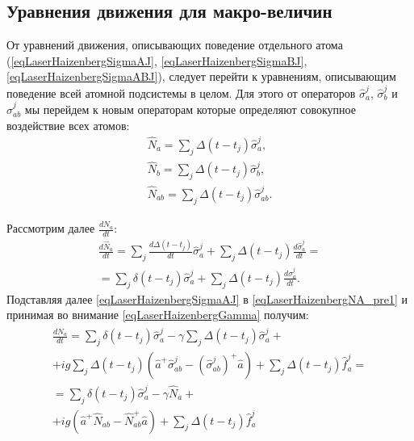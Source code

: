 \subsection{Уравнения движения для макро-величин}
От уравнений движения, описывающих поведение отдельного атома
(\ref{eqLaserHaizenbergSigmaAJ}, \ref{eqLaserHaizenbergSigmaBJ},
\ref{eqLaserHaizenbergSigmaABJ}), следует перейти к уравнениям,
описывающим поведение всей атомной подсистемы в целом. Для этого от
операторов $\hat{\sigma}^{j}_{a}$, $\hat{\sigma}^{j}_{b}$ и
$\hat{\sigma}^{j}_{ab}$ мы перейдем к новым операторам которые
определяют совокупное воздействие всех атомов:
\begin{eqnarray}
\hat{N}_{a} = \sum_j \Delta\left(t - t_j\right)\hat{\sigma}^{j}_{a}, 
\nonumber \\
\hat{N}_{b} = \sum_j \Delta\left(t - t_j\right)\hat{\sigma}^{j}_{b}, 
\nonumber \\
\hat{N}_{ab} = \sum_j \Delta\left(t - t_j\right)\hat{\sigma}^{j}_{ab}.
\label{eqLaserHaizenbergSigmaMacroDef}
\end{eqnarray}

Рассмотрим далее $\frac{d \hat{N}_{a}}{d t}$:
\begin{eqnarray}
\frac{d \hat{N}_{a}}{d t} = 
\sum_j \frac{d \Delta\left(t - t_j\right)}{d t}\hat{\sigma}^{j}_{a} +
\sum_j \Delta\left(t - t_j\right)\frac{d \hat{\sigma}^{j}_{a}}{d t} = 
\nonumber \\
= \sum_j \delta\left(t - t_j\right)\hat{\sigma}^{j}_{a} + \sum_j
\Delta\left(t - t_j\right)\frac{d \hat{\sigma}^{j}_{a}}{d t}. 
\label{eqLaserHaizenbergNA_pre1}
\end{eqnarray}
Подставляя далее \eqref{eqLaserHaizenbergSigmaAJ} в
\eqref{eqLaserHaizenbergNA_pre1} и принимая во внимание
\eqref{eqLaserHaizenbergGamma} получим:
\begin{eqnarray}
\frac{d \hat{N}_{a}}{d t} 
= \sum_j \delta\left(t - t_j\right)\hat{\sigma}^{j}_{a} - \gamma
\sum_j \Delta\left(t - t_j\right) \hat{\sigma}_{a}^{j} +
\nonumber \\
+
i g \sum_j
\Delta\left(t - t_j\right) 
 \left(
\hat{a}^{+}\hat{\sigma}^{j}_{ab} -
\left(\hat{\sigma}^{j}_{ab}\right)^{+}\hat{a}
\right) + \sum_j \Delta\left(t - t_j\right) \hat{f}_{a}^{j} = 
\nonumber \\
= 
\sum_j \delta\left(t - t_j\right)\hat{\sigma}^{j}_{a} - \gamma
\hat{N}_{a} + 
\nonumber \\ 
+ i g  \left(
\hat{a}^{+}\hat{N}_{ab} -
\hat{N}_{ab}^{+}\hat{a}
\right) + \sum_j \Delta\left(t - t_j\right) \hat{f}_{a}^{j}
\label{eqLaserHaizenbergNA_pre2}
\end{eqnarray}


